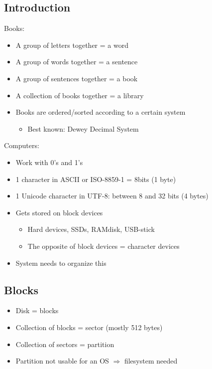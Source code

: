 \documentclass{article}
\begin{document}
\subsection{Introduction}

Books:

\begin{itemize}
    \item A group of letters together = a word
    \item A group of words together = a sentence
    \item A group of sentences together = a book
    \item A collection of books together = a library
    \item Books are ordered/sorted according to a certain system
    \begin{itemize}
        \item Best known: Dewey Decimal System
    \end{itemize}
\end{itemize}

Computers: 

\begin{itemize}
    \item Work with 0's and 1's
    \item 1 character in ASCII or ISO-8859-1 = 8bits (1 byte)
    \item 1 Unicode character in UTF-8: between 8 and 32 bits (4 bytes)
    \item Gets stored on block devices
    \begin{itemize}
        \item Hard devices, SSDs, RAMdisk, USB-stick
        \item The opposite of block devices = character devices 
    \end{itemize}
    \item System needs to organize this
\end{itemize}

\subsection{Blocks}

\begin{itemize}
    \item Disk = blocks
    \item Collection of blocks = sector (mostly 512 bytes)
    \item Collection of sectors = partition
    \item Partition not usable for an OS $\Rightarrow$ filesystem needed
\end{itemize}
\end{document}
